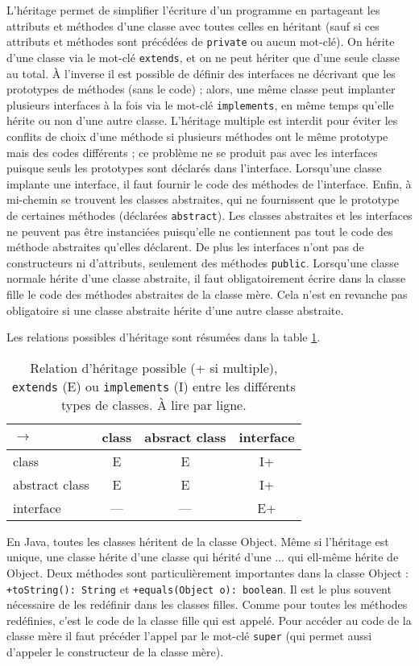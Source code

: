 \documentclass[10pt]{article}
\begin{document}
L'héritage permet de simplifier l'écriture d'un programme en partageant les attributs et méthodes d'une classe
avec toutes celles en héritant (sauf si ces attributs et méthodes sont précédées de \texttt{private} ou aucun mot-clé). 
On hérite d'une classe via le mot-clé \texttt{extends}, et on ne peut hériter que d'une seule classe au total.
À l'inverse il est possible de définir des interfaces ne décrivant que les prototypes de méthodes (sans le code) ;
alors, une même classe peut implanter plusieurs interfaces à la fois via le mot-clé \texttt{implements}, en même temps
qu'elle hérite ou non d'une autre classe. L'héritage multiple est interdit pour éviter les conflits de choix
d'une méthode si plusieurs méthodes ont le même prototype mais des codes différents ; ce problème ne se produit pas avec
les interfaces puisque seuls les prototypes sont déclarés dans l'interface. Lorsqu'une classe implante une interface,
il faut fournir le code des méthodes de l'interface. Enfin, à mi-chemin se trouvent les classes abstraites,
qui ne fournissent que le prototype de certaines méthodes (déclarées \texttt{abstract}). Les classes abstraites
et les interfaces ne peuvent pas être instanciées puisqu'elle ne contiennent pas tout le code des méthode abstraites
qu'elles déclarent. De plus les interfaces n'ont pas de constructeurs ni d'attributs, seulement des méthodes \texttt{public}. Lorsqu'une classe normale hérite d'une classe abstraite, il faut obligatoirement écrire dans la classe fille le code des méthodes abstraites de la classe mère. Cela n'est en revanche pas obligatoire si une classe abstraite hérite d'une autre classe abstraite.


Les relations possibles d'héritage sont résumées dans la table \ref{tab.heritage}.
\begin{table}[h!]
  \centering
\begin{tabular}{|l|c|c|c|}
  \hline
  $\longrightarrow$ & class & absract class & interface\\
  \hline
  class & E & E & I+\\
  \hline
  abstract class & E & E & I+ \\
  \hline
  interface & --- & --- & E+ \\
  \hline  
\end{tabular}
\caption{Relation d'héritage possible (+ si multiple), \texttt{extends} (E) ou \texttt{implements} (I) entre les différents types de classes. À lire par ligne.
   \label{tab.heritage}}
\end{table}

En Java, toutes les classes héritent de la classe Object. Même si l'héritage est unique, une classe hérite d'une classe qui hérité d'une ...  qui ell-même hérite de Object.
Deux méthodes sont particulièrement importantes dans la classe Object : \texttt{+toString(): String} et \texttt{+equals(Object o): boolean}. Il est le plus souvent nécessaire
de les redéfinir dans les classes filles. Comme pour toutes les méthodes redéfinies, c'est le code de la classe fille qui est appelé. Pour accéder au code de la classe
mère il faut précéder l'appel par le mot-clé \texttt{super} (qui permet aussi d'appeler le constructeur de la classe mère).
\end{document}
